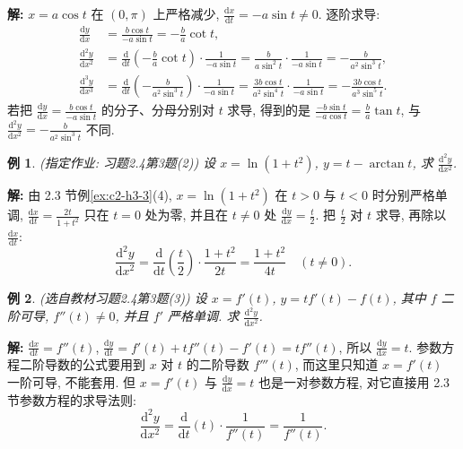 \documentclass[UTF8,openany]{ctexbook}
\theoremstyle{chinesetextbook}
\newtheorem{example}{例}[section]
\newenvironment{cnsolution}{\par\indent\textbf{解:} \ignorespaces}{\par}
\newcommand{\dd}{\mathrm d}
\begin{document}
\begin{cnsolution}
$x=a\cos t$ 在 $(0,\pi)$ 上严格减少, $\displaystyle\frac{\dd x}{\dd t}=-a\sin t\ne0$. 逐阶求导:
\[
\begin{aligned}
\frac{\dd y}{\dd x}&=\frac{b\cos t}{-a\sin t}=-\frac ba\cot t,\\
\frac{\dd^2y}{\dd x^2}&=\frac{\dd}{\dd t}\left(-\frac ba\cot t\right)\cdot\frac1{-a\sin t}=\frac b{a\sin^2t}\cdot\frac1{-a\sin t}=-\frac b{a^2\sin^3t},\\
\frac{\dd^3y}{\dd x^3}&=\frac{\dd}{\dd t}\left(-\frac b{a^2\sin^3t}\right)\cdot\frac1{-a\sin t}=\frac{3b\cos t}{a^2\sin^4t}\cdot\frac1{-a\sin t}=-\frac{3b\cos t}{a^3\sin^5t}.
\end{aligned}
\]
若把 $\displaystyle\frac{\dd y}{\dd x}=\frac{b\cos t}{-a\sin t}$ 的分子、分母分别对 $t$ 求导, 得到的是 $\displaystyle\frac{-b\sin t}{-a\cos t}=\frac ba\tan t$, 与 $\displaystyle\frac{\dd^2y}{\dd x^2}=-\frac b{a^2\sin^3t}$ 不同.
\end{cnsolution}
\begin{example}\label{ex:c2-h4-3b}
\textnormal{(指定作业: 习题2.4第3题(2))} 设 $x=\ln(1+t^2)$, $y=t-\arctan t$, 求 $\displaystyle\frac{\dd^2y}{\dd x^2}$.
\end{example}
\begin{cnsolution}
由 2.3 节例\ref{ex:c2-h3-3}(4), $x=\ln(1+t^2)$ 在 $t>0$ 与 $t<0$ 时分别严格单调, $\displaystyle\frac{\dd x}{\dd t}=\frac{2t}{1+t^2}$ 只在 $t=0$ 处为零, 并且在 $t\ne0$ 处 $\displaystyle\frac{\dd y}{\dd x}=\frac t2$. 把 $\displaystyle\frac t2$ 对 $t$ 求导, 再除以 $\displaystyle\frac{\dd x}{\dd t}$:
\[
\frac{\dd^2y}{\dd x^2}=\frac{\dd}{\dd t}\left(\frac t2\right)\cdot\frac{1+t^2}{2t}=\frac{1+t^2}{4t}\quad(t\ne0).
\]
\end{cnsolution}
\begin{example}\label{ex:c2-h4-3}
\textnormal{(选自教材习题2.4第3题(3))} 设 $x=f'(t)$, $y=tf'(t)-f(t)$, 其中 $f$ 二阶可导, $f''(t)\ne0$, 并且 $f'$ 严格单调. 求 $\displaystyle\frac{\dd^2y}{\dd x^2}$.
\end{example}
\begin{cnsolution}
$\displaystyle\frac{\dd x}{\dd t}=f''(t)$, $\displaystyle\frac{\dd y}{\dd t}=f'(t)+tf''(t)-f'(t)=tf''(t)$, 所以 $\displaystyle\frac{\dd y}{\dd x}=t$. 参数方程二阶导数的公式要用到 $x$ 对 $t$ 的二阶导数 $f'''(t)$, 而这里只知道 $x=f'(t)$ 一阶可导, 不能套用. 但 $x=f'(t)$ 与 $\displaystyle\frac{\dd y}{\dd x}=t$ 也是一对参数方程, 对它直接用 2.3 节参数方程的求导法则:
\[
\frac{\dd^2y}{\dd x^2}=\frac{\dd}{\dd t}(t)\cdot\frac1{f''(t)}=\frac1{f''(t)}.
\]
\end{cnsolution}
\end{document}
